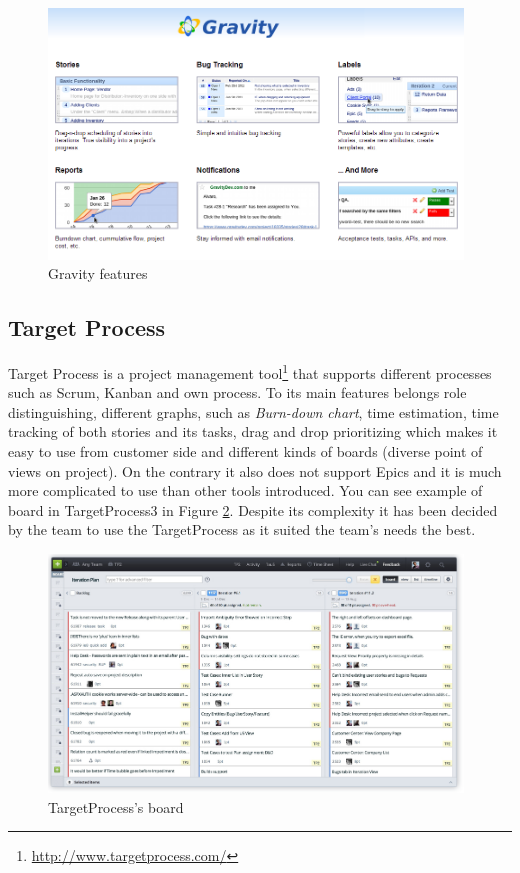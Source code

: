 \begin{figure}[!h]
	\centering
		\includegraphics[width=11cm]{preliminaryStudies/gravity.png}
	\caption{Gravity features}
	\label{fig:gravity}
\end{figure}
\newpage
\subsection{Target Process} 
\label{subsec:targetProcessToolDescription}
Target Process is a project management tool\footnote{\url{http://www.targetprocess.com/}} that supports different processes such as Scrum, Kanban and own process. 
To its main features belongs role distinguishing, different graphs, such as \emph{Burn-down chart}, time estimation, time tracking of both stories and its tasks, drag and drop prioritizing which makes it easy to use from customer side and different kinds of boards (diverse point of views on project).
On the contrary it also does not support Epics and it is much more complicated to use than other tools introduced.
You can see example of board in TargetProcess3 in Figure \ref{fig:targetp}. Despite its complexity it has been decided by the team to use the TargetProcess as it suited the team's needs the best.

\begin{figure}[!h]
	\centering
		\includegraphics[width=11cm]{preliminaryStudies/targetp.png}
	\caption{TargetProcess's board}
	\label{fig:targetp}
\end{figure}

